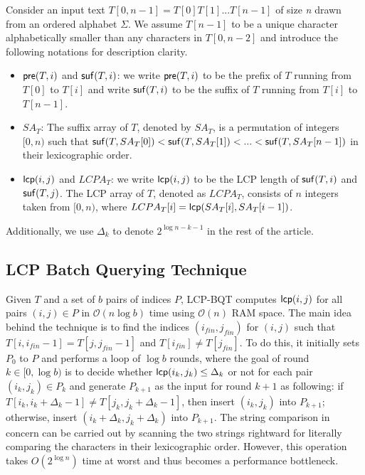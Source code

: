 \documentclass{llncs}
\begin{document}
Consider an input text $T[0,n-1] =T[0]T[1]...T[n-1]$ of size {\em n} drawn from an ordered alphabet $\Sigma$. We assume $T[n-1]$ to be a unique character alphabetically smaller than any characters in $T[0,n-2]$ and introduce the following notations for description clarity.

\begin{itemize}
\item ${\sf pre}(T,i)$ and ${\sf suf}(T,i)$: we write ${\sf pre}(T,i)$ to be the prefix of $T$ running from $T[0]$ to $T[i]$ and write ${\sf suf}(T,i)$ to be the suffix of $T$ running from $T[i]$ to $T[n-1]$.
\item  $SA_T$:  The suffix array of $T$, denoted by $SA_T$, is a permutation of integers $[0,n)$ such that ${\sf suf}(T,SA_T[0])<{\sf suf}(T,SA_T[1])<...<{\sf suf}(T,SA_T[n-1])$ in their lexicographic order.
\item ${\sf lcp}(i,j)$ and $LCPA_T$: we write ${\sf lcp}(i,j)$ to be the {LCP} length of ${\sf suf}(T,i)$ and ${\sf suf}(T,j)$. The {LCP} array of $T$, denoted as $LCPA_T$, consists of $n$ integers taken from $[0,n)$, where $LCPA_T[i]= {\sf lcp}(SA_T[i],SA_T[i-1])$.
\end{itemize}

Additionally, we use $\Delta_{k}$ to denote $2^{\log n - k - 1}$ in the rest of the article.

\subsection{LCP Batch Querying Technique}\label{subsec:lcp_batch_querying_technique}

Given $T$ and a set of $b$ pairs of indices $P$, {LCP-BQT} computes ${\sf lcp}(i,j)$ for all pairs $(i,j)\in P$ in $\mathcal{O}(n\log b)$ time using $\mathcal{O}(n)$ {RAM} space. The main idea behind the technique is to find the indices $(i_{fin}, j_{fin})$ for $(i,j)$ such that $T[i,i_{fin}-1]=T[j,j_{fin}-1]$ and $T[i_{fin}] \neq T[j_{fin}]$. To do this, it initially sets $P_0$ to $P$ and performs a loop of $\log b$ rounds, where the goal of round $k\in [0,\log b)$ is to decide whether ${\sf lcp}(i_k,j_k) \le \Delta_k$ or not for each pair $(i_k,j_k)\in P_k$ and generate $P_{k+1}$ as the input for round $k+1$ as following: if $T[i_k,i_k+\Delta_k-1] \neq T[j_k,j_k+\Delta_k-1]$, then insert $(i_k,j_k)$ into $P_{k+1}$; otherwise, insert $(i_k+\Delta_k,j_k+\Delta_k)$ into $P_{k+1}$. The string comparison in concern can be carried out by scanning the two strings rightward for literally comparing the characters in their lexicographic order. However, this operation takes $O(2^{\log n})$ time at worst and thus becomes a performance bottleneck.
\end{document}
